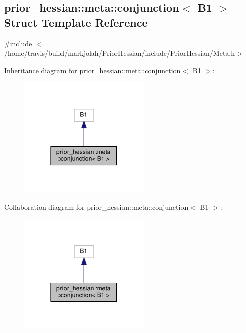 \hypertarget{structprior__hessian_1_1meta_1_1conjunction_3_01B1_01_4}{}\subsection{prior\+\_\+hessian\+:\+:meta\+:\+:conjunction$<$ B1 $>$ Struct Template Reference}
\label{structprior__hessian_1_1meta_1_1conjunction_3_01B1_01_4}


{\ttfamily \#include $<$/home/travis/build/markjolah/\+Prior\+Hessian/include/\+Prior\+Hessian/\+Meta.\+h$>$}



Inheritance diagram for prior\+\_\+hessian\+:\+:meta\+:\+:conjunction$<$ B1 $>$\+:\nopagebreak
\begin{figure}[H]
\begin{center}
\leavevmode
\includegraphics[width=178pt]{structprior__hessian_1_1meta_1_1conjunction_3_01B1_01_4__inherit__graph}
\end{center}
\end{figure}


Collaboration diagram for prior\+\_\+hessian\+:\+:meta\+:\+:conjunction$<$ B1 $>$\+:\nopagebreak
\begin{figure}[H]
\begin{center}
\leavevmode
\includegraphics[width=178pt]{structprior__hessian_1_1meta_1_1conjunction_3_01B1_01_4__coll__graph}
\end{center}
\end{figure}


